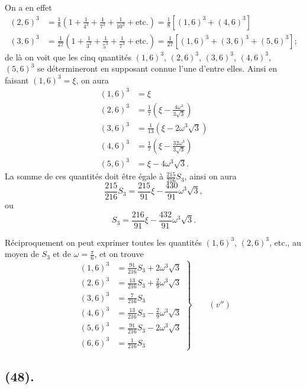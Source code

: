 \documentclass{article}
\begin{document}
On a en effet
\[ \begin{aligned} (2,6)^{3}&=\frac{1}{8}\left(1+\frac{1}{4^{3}}+\frac{1}{7^{3}}+\frac{1}{10^{3}}+\text{etc.}\right)=\frac{1}{8}[(1,6)^{3}+(4,6)^{3}]\\ (3,6)^{3}&=\frac{1}{27}\left(1+\frac{1}{3^{3}}+\frac{1}{5^{3}}+\frac{1}{7^{3}}+\text{etc.}\right)=\frac{1}{27}[(1,6)^{3}+(3,6)^{3}+(5,6)^{3}]; \end{aligned} \]
de là on voit que les cinq qnantités $(1,6)^{3}$, $(2,6)^{3}$, $(3,6)^{3}$, $(4,6)^{3}$, $(5,6)^{3}$ se détermineront en supposant connue l'une d'entre elles. Ainsi en faisant $(1,6)^{3}=\xi$, on aura
\[ \begin{aligned} (1,6)^{3}&=\xi\\ (2,6)^{3}&=\frac{1}{7}\left(\xi-\frac{4\omega^{3}}{3\sqrt{3}}\right)\\ (3,6)^{3}&=\frac{1}{13}\left(\xi-2\omega^{3}\sqrt{3}\right)\\ (4,6)^{3}&=\frac{1}{7}\left(\xi-\frac{32\omega^{3}}{3\sqrt{3}}\right)\\ (5,6)^{3}&=\xi-4\omega^{3}\sqrt{3}. \end{aligned} \]
La somme de ces quantités doit être égale à $\frac{215}{216}S_{3}$, ainsi on aura
\[ \frac{215}{216}S_{3}=\frac{215}{91}\xi-\frac{430}{91}\omega^{3}\sqrt{3}, \]
ou
\[ S_{3}=\frac{216}{91}\xi-\frac{432}{91}\omega^{3}\sqrt{3}. \]


Réciproquement on peut exprimer toutes les quantités $(1,6)^{3}$, $(2,6)^{3}$, etc., au moyen de $S_{3}$ et de $\omega=\frac{\pi}{6}$, et on trouve
\[ \left.\begin{aligned} (1,6)^{3}&=\frac{91}{216}S_{3}+2\omega^{3}\sqrt{3}\\ (2,6)^{3}&=\frac{13}{216}S_{3}+\frac{2}{9}\omega^{3}\sqrt{3}\\ (3,6)^{3}&=\frac{7}{216}S_{3}\\ (4,6)^{3}&=\frac{13}{216}S_{3}-\frac{2}{9}\omega^{3}\sqrt{3}\\ (5,6)^{3}&=\frac{91}{216}S_{3}-2\omega^{3}\sqrt{3}\\ (6,6)^{3}&=\frac{1}{216}S_{3} \end{aligned}\right\}\qquad(v'') \]

\subsection*{(48).}
\end{document}
